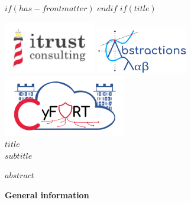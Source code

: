 $if(has-frontmatter)$
\frontmatter
$endif$
$if(title)$
\cleardoublepage
\thispagestyle{empty}

{\centering

\vspace{-3cm}
    \includegraphics[width=0.3\textwidth]{figs/ITR-logo.jpg}
    \hfill
    \includegraphics[width=0.3\textwidth]{figs/Alab-logo.png}\\
    [1cm]
    \includegraphics[width=0.4\textwidth]{figs/CyFORT-logo.png}\\
    [2cm]
    \centering
    \Huge \textbf{\textcolor{AlabRed}{$title$}} \\
    [0.5cm]
\Large \textcolor{AlabLightBlue}{$subtitle$}


\vspace{4ex}

\begin{justify}
{\normalsize {$abstract$}}
\end{justify}


\vspace{10ex}

\begin{flushleft}
\textcolor{AlabRed}{\textbf{General information}}\\
\end{flushleft}
\vspace{1ex}

}
